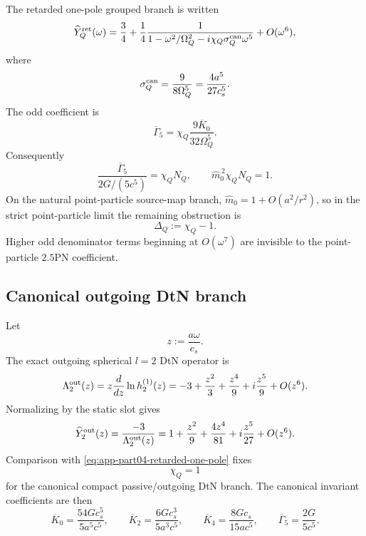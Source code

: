 The retarded one-pole grouped branch is written
\begin{equation}
\label{eq:app-part04-retarded-one-pole}
\widehat Y_Q^{\rm ret}(\omega)
=
\frac34+\frac14
\frac{1}{1-\omega^2/\Omega_Q^2-i\chi_Q\sigma_Q^{\rm can}\omega^5}
+O(\omega^6),
\end{equation}
where
\begin{equation}
\label{eq:app-part04-sigmaQcan}
\sigma_Q^{\rm can}=\frac{9}{8\Omega_Q^5}=\frac{4a^5}{27c_s^5}.
\end{equation}
The odd coefficient is
\begin{equation}
\label{eq:app-part04-gamma5-chiN}
\overline\Gamma_5
=\chi_Q\frac{9\overline K_0}{32\Omega_Q^5}.
\end{equation}
Consequently
\begin{equation}
\label{eq:app-part04-factorized-defect-again}
\frac{\overline\Gamma_5}{2G/(5c^5)}=\chi_Q N_Q,
\qquad
\widehat m_0^{\,2}\chi_Q N_Q=1.
\end{equation}
On the natural point-particle source-map branch, \(\widehat m_0=1+O(a^2/r^2)\), so in the strict point-particle limit the remaining obstruction is
\begin{equation}
\label{eq:app-part04-DeltaQ-def}
\Delta_Q:=\chi_Q-1.
\end{equation}
Higher odd denominator terms beginning at \(O(\omega^7)\) are invisible to the point-particle \(2.5\)PN coefficient.

\subsection{Canonical outgoing DtN branch}
\label{subsec:app-part04-canonical-dtn}

Let
\begin{equation}
\label{eq:app-part04-z-def}
z:=\frac{a\omega}{c_s}.
\end{equation}
The exact outgoing spherical \(l=2\) DtN operator is
\begin{equation}
\label{eq:app-part04-Lambda-out-dtn}
\Lambda_2^{\rm out}(z)
=
z\frac{d}{dz}\ln h_2^{(1)}(z)
=
-3+\frac{z^2}{3}+\frac{z^4}{9}+i\frac{z^5}{9}+O(z^6).
\end{equation}
Normalizing by the static slot gives
\begin{equation}
\label{eq:app-part04-Yout-dtn}
\widehat Y_2^{\rm out}(z)
=
\frac{-3}{\Lambda_2^{\rm out}(z)}
=
1+\frac{z^2}{9}+\frac{4z^4}{81}+i\frac{z^5}{27}+O(z^6).
\end{equation}
Comparison with \eqref{eq:app-part04-retarded-one-pole} fixes
\begin{equation}
\label{eq:app-part04-chiQ-equals-one}
\chi_Q=1
\end{equation}
for the canonical compact passive/outgoing DtN branch.  The canonical invariant coefficients are then
\begin{equation}
\label{eq:app-part04-canonical-invariant-coeffs}
\overline K_0=\frac{54Gc_s^5}{5a^5c^5},
\qquad
\overline K_2=\frac{6Gc_s^3}{5a^3c^5},
\qquad
\overline K_4=\frac{8Gc_s}{15ac^5},
\qquad
\overline\Gamma_5=\frac{2G}{5c^5}.
\end{equation}

